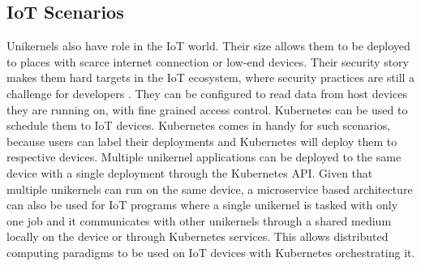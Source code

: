 \subsection{IoT Scenarios}
Unikernels also have role in the IoT world. Their size allows them to be deployed to places with scarce internet connection or low-end devices. Their security story makes them hard targets in the IoT ecosystem, where security practices are still a challenge for developers \cite{iot-sec}. They can be configured to read data from host devices they are running on, with fine grained access control. Kubernetes can be used to schedule them to IoT devices. Kubernetes comes in handy for such scenarios, because users can label their deployments and Kubernetes will deploy them to respective devices. Multiple unikernel applications can be deployed to the same device with a single deployment through the Kubernetes API. Given that multiple unikernels can run on the same device, a microservice based architecture can also be used for IoT programs where a single unikernel is tasked with only one job and it communicates with other unikernels through a shared medium locally on the device or through Kubernetes services. This allows distributed computing paradigms to be used on IoT devices with Kubernetes orchestrating it.

